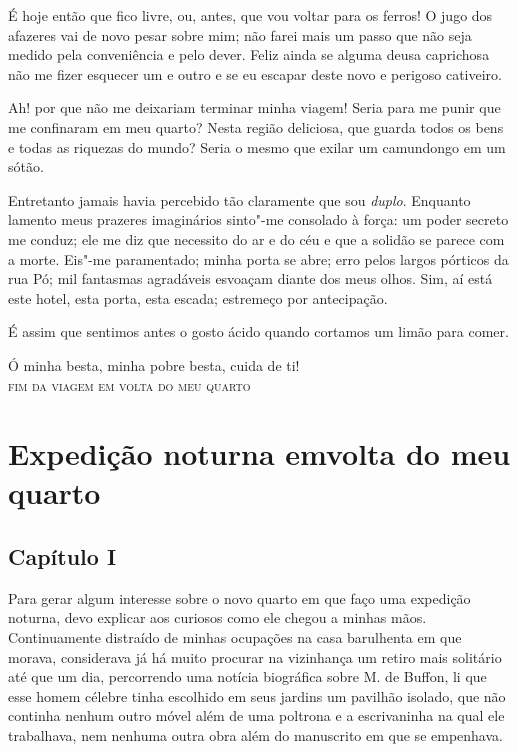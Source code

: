  É hoje então que fico livre, ou, antes, que vou voltar para os ferros!
O jugo dos afazeres vai de novo pesar sobre mim; não farei mais um
passo que não seja medido pela conveniência e pelo dever. Feliz
ainda se alguma deusa caprichosa não me fizer esquecer um e outro e se
eu escapar deste novo e perigoso cativeiro.

 Ah! por que não me deixariam terminar minha viagem! Seria para me punir
que me confinaram em meu quarto? Nesta região deliciosa, que guarda
todos os bens e todas as riquezas do mundo? Seria o mesmo que exilar um
camundongo em um sótão.  

 Entretanto jamais havia percebido tão claramente que sou
\textit{duplo}. Enquanto lamento meus prazeres imaginários sinto"-me
consolado à força: um poder secreto me conduz; ele me diz que necessito
do ar e do céu e que a solidão se parece com a morte. Eis"-me
paramentado; minha porta se abre; erro pelos largos pórticos da rua Pó;
mil fantasmas agradáveis esvoaçam diante dos meus olhos. Sim, aí está
este hotel, esta porta,  esta escada; estremeço por \mbox{antecipação.}
\pagebreak

É assim que sentimos antes o gosto ácido quando cortamos um limão para
comer. 

Ó minha besta, minha pobre besta, cuida de ti!
\ \\

\hfil\textsc{fim da viagem em volta do meu quarto}

\chapter[Expedição noturna em volta do meu quarto]{Expedição noturna em\break volta do meu quarto}

\section*{Capítulo I}

Para gerar algum interesse sobre o novo quarto em que faço uma expedição
noturna, devo explicar aos curiosos como ele chegou a minhas mãos.
Continuamente distraído de minhas ocupações na casa barulhenta em que
morava, considerava já há muito procurar na vizinhança um retiro mais
solitário até que um dia, percorrendo uma notícia biográfica sobre M.
de Buffon, li que esse homem célebre tinha escolhido em seus jardins um
pavilhão isolado, que não continha nenhum outro móvel além de uma
poltrona e a escrivaninha na qual ele trabalhava, nem nenhuma outra
obra além do manuscrito em que se empenhava. 

